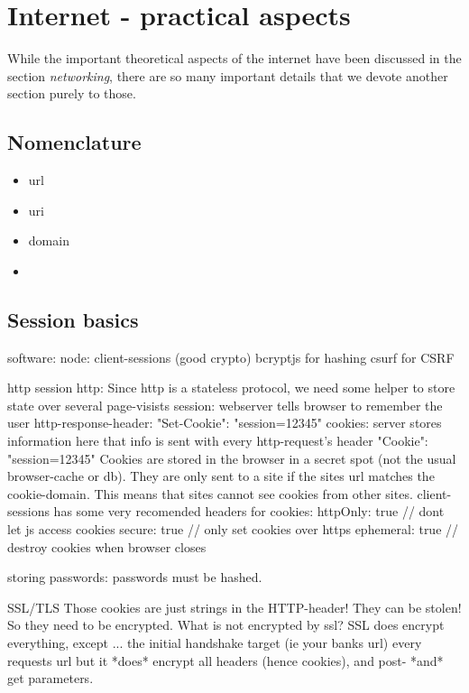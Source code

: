 \section{Internet - practical aspects}

While the important theoretical aspects of the internet have been discussed in the section \emph{networking}, there are so many important details that we devote another section purely to those. 

\subsection{Nomenclature}

\begin{itemize}
	\item url
	\item uri
	\item domain
	\item 
\end{itemize}




\subsection{Session basics}

software:
     node: client-sessions (good crypto)
     bcryptjs for hashing
     csurf for CSRF


http session
    http: Since http is a stateless protocol, we need some helper to store state over several page-visists
    session: webserver tells browser to remember the user
           http-response-header: "Set-Cookie": "session=12345"
           cookies:  server stores information here
                          that info is sent with every http-request's header
                          "Cookie": "session=12345"
                         Cookies are stored in the browser in a secret spot (not the usual browser-cache or db). They are only sent to a site if the sites url matches the cookie-domain. This means that sites cannot see cookies from other sites.
                   client-sessions has some very recomended headers for cookies:
                        httpOnly: true // dont let js access cookies
                        secure: true // only set cookies over https
                        ephemeral: true // destroy cookies when browser closes

storing passwords:
    passwords must be hashed.


SSL/TLS
     Those cookies are just strings in the HTTP-header! They can be stolen! So they need to be encrypted.
     What is not encrypted by ssl?
           SSL does encrypt everything, except ...
                       the initial handshake target (ie your banks url)
                       every requests url 
             but it *does* encrypt all headers (hence cookies), and post- *and* get parameters.
      



